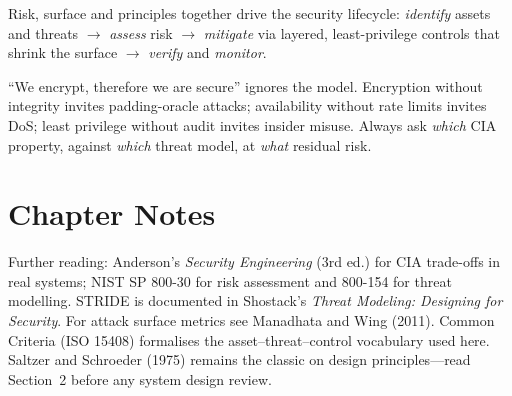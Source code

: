 Risk, surface and principles together drive the security lifecycle: \emph{identify} assets and threats $\to$ \emph{assess} risk $\to$ \emph{mitigate} via layered, least-privilege controls that shrink the surface $\to$ \emph{verify} and \emph{monitor}.

\begin{remark}
``We encrypt, therefore we are secure'' ignores the model. Encryption without integrity invites padding-oracle attacks; availability without rate limits invites DoS; least privilege without audit invites insider misuse. Always ask \emph{which} CIA property, against \emph{which} threat model, at \emph{what} residual risk.
\end{remark}

\section{Chapter Notes}
Further reading: Anderson's \emph{Security Engineering} (3rd ed.) for CIA trade-offs in real systems; NIST SP 800-30 for risk assessment and 800-154 for threat modelling. STRIDE is documented in Shostack's \emph{Threat Modeling: Designing for Security}. For attack surface metrics see Manadhata and Wing (2011). Common Criteria (ISO 15408) formalises the asset--threat--control vocabulary used here. Saltzer and Schroeder (1975) remains the classic on design principles---read Section~2 before any system design review.

